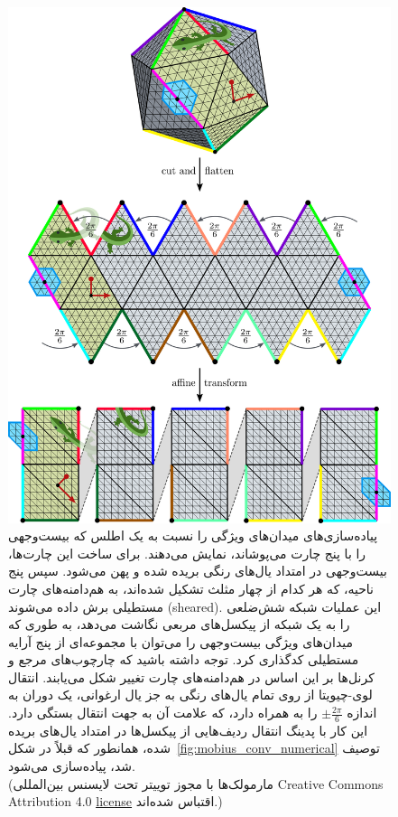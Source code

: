 \begin{figure}
    \centering
    \includegraphics[width=.9\textwidth]{figures/icosahedron_cutting.pdf}
    \vspace*{1.5ex}
    \caption{\small
        پیاده‌سازی‌های \cite{liu2018icoAltAz,gaugeIco2019,zhang2019orientation} میدان‌های ویژگی را نسبت به یک اطلس که بیست‌وجهی را با پنج چارت می‌پوشاند، نمایش می‌دهند.
        برای ساخت این چارت‌ها، بیست‌وجهی در امتداد یال‌های رنگی بریده شده و پهن می‌شود.
        سپس پنج ناحیه، که هر کدام از چهار مثلث تشکیل شده‌اند، به هم‌دامنه‌های چارت مستطیلی برش داده می‌شوند (sheared).
        این عملیات شبکه شش‌ضلعی را به یک شبکه از پیکسل‌های مربعی نگاشت می‌دهد، به طوری که میدان‌های ویژگی بیست‌وجهی را می‌توان با مجموعه‌ای از پنج آرایه مستطیلی کدگذاری کرد.
        توجه داشته باشید که چارچوب‌های مرجع و کرنل‌ها بر این اساس در هم‌دامنه‌های چارت تغییر شکل می‌یابند.
        انتقال لوی-چیویتا از روی تمام یال‌های رنگی به جز یال ارغوانی، یک دوران به اندازه $\pm\frac{2\pi}{6}$ را به همراه دارد، که علامت آن به جهت انتقال بستگی دارد.
        این کار با پدینگ انتقال ردیف‌هایی از پیکسل‌ها در امتداد یال‌های بریده شده، همانطور که قبلاً در شکل~\ref{fig:mobius_conv_numerical} توصیف شد، پیاده‌سازی می‌شود.
        {
        \\ \color{gray} \scriptsize
            (مارمولک‌ها با مجوز توییتر تحت لایسنس بین‌المللی 
            Creative Commons Attribution 4.0 
            \href{https://github.com/twitter/twemoji/blob/gh-pages/LICENSE-GRAPHICS}{\underline{license}}
            اقتباس شده‌اند.)
        }
    }
    \label{fig:ico_cutting}
\end{figure}


